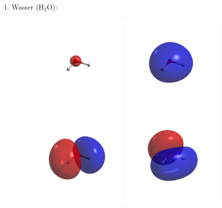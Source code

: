 \begin{enumerate}
\newpage
\item Wasser (H$_2$O):
\begin{figure}[H]
\centering
\includegraphics[trim=700 800 700 600, clip, width=0.45\textwidth]{res/H2O/h2o_w0.png}
\includegraphics[trim=700 800 700 600, clip, width=0.45\textwidth]{res/H2O/h2o_w1.png}\\
\includegraphics[trim=700 800 700 600, clip, width=0.45\textwidth]{res/H2O/h2o_w2.png}
\includegraphics[trim=700 800 700 600, clip, width=0.45\textwidth]{res/H2O/h2o_w3.png}\\

\end{figure}
\end{enumerate}
